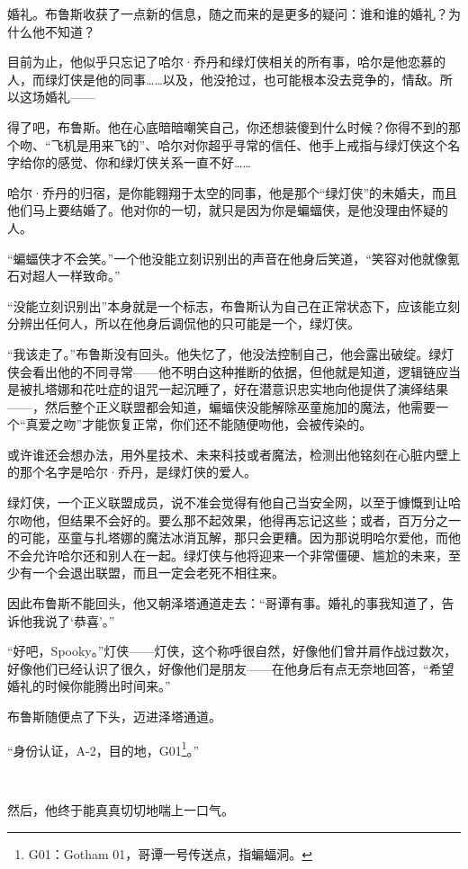 \documentclass[../main.tex]{subfiles}
\begin{document}
婚礼。布鲁斯收获了一点新的信息，随之而来的是更多的疑问：谁和谁的婚礼？为什么他不知道？

目前为止，他似乎只忘记了哈尔·乔丹和绿灯侠相关的所有事，哈尔是他恋慕的人，而绿灯侠是他的同事……以及，他没抢过，也可能根本没去竞争的，情敌。所以这场婚礼——

得了吧，布鲁斯。他在心底暗暗嘲笑自己，你还想装傻到什么时候？你得不到的那个吻、“飞机是用来飞的”、哈尔对你超乎寻常的信任、他手上戒指与绿灯侠这个名字给你的感觉、你和绿灯侠关系一直不好……

哈尔·乔丹的归宿，是你能翱翔于太空的同事，他是那个“绿灯侠”的未婚夫，而且他们马上要结婚了。他对你的一切，就只是因为你是蝙蝠侠，是他没理由怀疑的人。

“蝙蝠侠才不会笑。”一个他没能立刻识别出的声音在他身后笑道，“笑容对他就像氪石对超人一样致命。”

“没能立刻识别出”本身就是一个标志，布鲁斯认为自己在正常状态下，应该能立刻分辨出任何人，所以在他身后调侃他的只可能是一个，绿灯侠。

“我该走了。”布鲁斯没有回头。他失忆了，他没法控制自己，他会露出破绽。绿灯侠会看出他的不同寻常——他不明白这种推断的依据，但他就是知道，逻辑链应当是被扎塔娜和花吐症的诅咒一起沉睡了，好在潜意识忠实地向他提供了演绎结果——，然后整个正义联盟都会知道，蝙蝠侠没能解除巫童施加的魔法，他需要一个“真爱之吻”才能恢复正常，你们还不能随便吻他，会被传染的。

或许谁还会想办法，用外星技术、未来科技或者魔法，检测出他铭刻在心脏内壁上的那个名字是哈尔·乔丹，是绿灯侠的爱人。

绿灯侠，一个正义联盟成员，说不准会觉得有他自己当安全网，以至于慷慨到让哈尔吻他，但结果不会好的。要么那不起效果，他得再忘记这些；或者，百万分之一的可能，巫童与扎塔娜的魔法冰消瓦解，那只会更糟。因为那说明哈尔爱他，而他不会允许哈尔还和别人在一起。绿灯侠与他将迎来一个非常僵硬、尴尬的未来，至少有一个会退出联盟，而且一定会老死不相往来。

因此布鲁斯不能回头，他又朝泽塔通道走去：“哥谭有事。婚礼的事我知道了，告诉他我说了`恭喜'。”

“好吧，Spooky。”灯侠——灯侠，这个称呼很自然，好像他们曾并肩作战过数次，好像他们已经认识了很久，好像他们是朋友——在他身后有点无奈地回答，“希望婚礼的时候你能腾出时间来。”

布鲁斯随便点了下头，迈进泽塔通道。

“身份认证，A-2，目的地，G01\footnote[1]{G01：Gotham 01，哥谭一号传送点，指蝙蝠洞。}。”

~\

然后，他终于能真真切切地喘上一口气。
\end{document}
